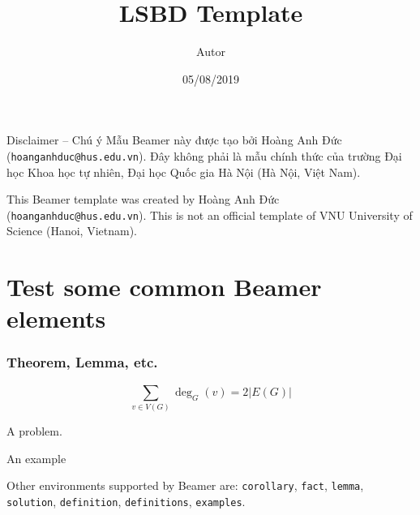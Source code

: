 \documentclass{beamer}
\title{LSBD Template}
\author{Autor}
\institute{Laboratório de Sistemas e Banco de Dados}
\date{05/08/2019}
\begin{document}
\begin{frame}
\placelogofalse %
\titlepage
\end{frame}

\placelogotrue %

\begin{frame}{Disclaimer -- Chú ý}
    Mẫu Beamer này được tạo bởi Hoàng Anh Đức (\texttt{hoanganhduc@hus.edu.vn}).
    Đây không phải là mẫu chính thức của trường Đại học Khoa học tự nhiên, Đại học Quốc gia Hà Nội (Hà Nội, Việt Nam).
    
    This Beamer template was created by Hoàng Anh Đức (\texttt{hoanganhduc@hus.edu.vn}).
    This is not an official template of VNU University of Science (Hanoi, Vietnam).
\end{frame}

\section{Test some common Beamer elements}


\begin{frame}[fragile]
	\frametitle{Theorem, Lemma, etc.}
	
	\begin{theorem}
	\[
		\sum_{v \in V(G)}\deg_G(v) = 2\vert E(G) \vert
	\]
	\end{theorem}
	
	\begin{problem}
	A problem.
	\end{problem}
	
	\begin{example}
	An example
	\end{example}
	
	Other environments supported by Beamer are: \verb+corollary+, \verb+fact+, \verb+lemma+, \verb+solution+, \verb+definition+, \verb+definitions+, \verb+examples+.
\end{frame}
\end{document}
